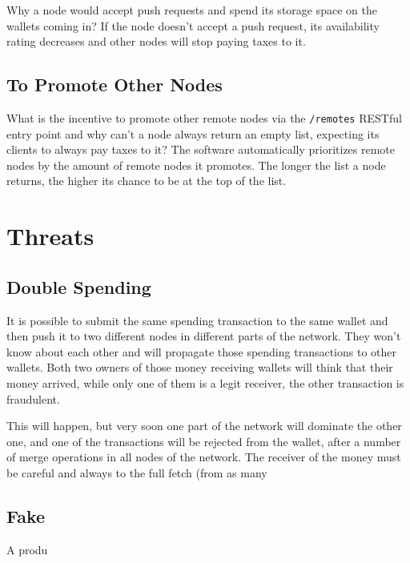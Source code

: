 \documentclass[11pt,oneside]{article}
\newcommand\dd[1]{\colorbox{gray!30}{\texttt{#1}}}
\begin{document}
Why a node would accept push requests and spend its storage space
on the wallets coming in? If the node doesn't accept a push request,
its availability rating decreases and other nodes will stop paying
taxes to it.

\subsection{To Promote Other Nodes}

What is the incentive to promote other remote nodes via the \dd{/remotes} RESTful
entry point and why can't a node always return an empty list, expecting its clients
to always pay taxes to it? The software automatically prioritizes remote
nodes by the amount of remote nodes it promotes. The longer the list a node
returns, the higher its chance to be at the top of the list.

\section{Threats}

\subsection{Double Spending}

It is possible to submit the same spending transaction to the same wallet
and then push it to two different nodes in different parts of the network.
They won't know about each other and will propagate those spending
transactions to other wallets. Both two owners of those money receiving
wallets will think that their money arrived, while only one of them is
a legit receiver, the other transaction is fraudulent.

This will happen, but very soon one part of the network will dominate the other
one, and one of the transactions will be rejected from the wallet, after
a number of merge operations in all nodes of the network. The receiver of the
money must be careful and always to the full fetch (from as many

\subsection{Fake }

A produ
\end{document}
